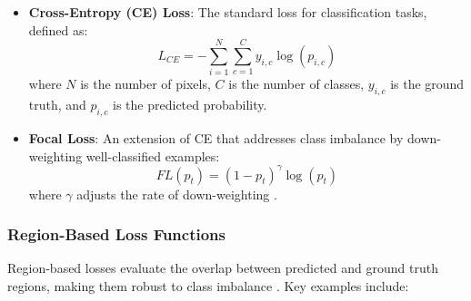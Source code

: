 \documentclass[review]{elsarticle}
\begin{document}
\begin{itemize}
    \item \textbf{Cross-Entropy (CE) Loss}: The standard loss for classification tasks, defined as:
    \begin{equation}\label{cross-entropy}
        L_{CE} = -\sum_{i=1}^{N} \sum_{c=1}^{C} y_{i,c} \log(p_{i,c})
    \end{equation}
    where $N$ is the number of pixels, $C$ is the number of classes, $y_{i,c}$ is the ground truth, and $p_{i,c}$ is the predicted probability.

    \item \textbf{Focal Loss}: An extension of CE that addresses class imbalance by down-weighting well-classified examples:
    \begin{equation}\label{focal-loss}
        \textit{FL}(p_t) = (1 - p_t)^\gamma \log(p_t)
    \end{equation}
    where $\gamma$ adjusts the rate of down-weighting \cite{lin2017focal}.
\end{itemize}

\subsubsection{Region-Based Loss Functions}
Region-based losses evaluate the overlap between predicted and ground truth regions, making them robust to class imbalance \cite{Zhao2020}. Key examples include:
\end{document}
